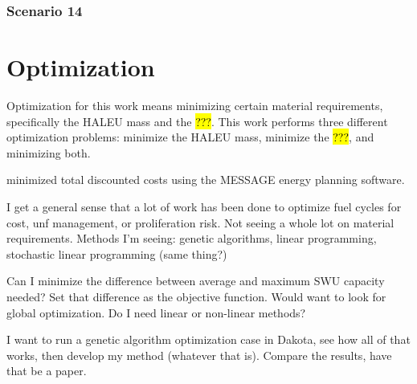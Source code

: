 \subsubsection{Scenario 14}

\section{Optimization}

Optimization for this work means minimizing certain material requirements, 
specifically the \gls{HALEU} mass and the \hl{???}. This work performs three 
different optimization problems: minimize the \gls{HALEU} mass, minimize the 
\hl{???}, and minimizing both. 

\cite{andrianov_optimization_2019} minimized total discounted costs using 
the MESSAGE energy planning software. 

I get a general sense that a lot of work has been done to optimize fuel cycles 
for cost, unf management, or proliferation risk. Not seeing a whole lot on 
material requirements. 
Methods I'm seeing: genetic algorithms, linear programming, stochastic linear 
programming (same thing?)

Can I minimize the difference between average and maximum SWU capacity needed?
Set that difference as the objective function. Would want to look for global 
optimization. Do I need linear or non-linear methods?

I want to run a genetic algorithm optimization case in Dakota, see how all of 
that works, then develop my method (whatever that is). Compare the results, have 
that be a paper. 
